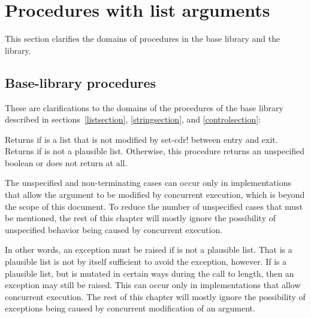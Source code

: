 \section{Procedures with list arguments}
\label{proceduresmutablelistargumentssection}

This section clarifies the domains of procedures in the base
library and the  library.

\subsection{Base-library procedures}

These are clarifications to the domains of the procedures of the base
library described in sections~\ref{listsection}, \ref{stringsection},
and \ref{controlsection}:

\begin{entry}{%
}

Returns \schtrue{} if  is a list that is not modified
by {\cf set-cdr!} between entry and exit.
Returns \schfalse{} if  is not a plausible list.
Otherwise, this procedure returns an unspecified boolean
or does not return at all.

\begin{note}
The unspecified and non-terminating cases can occur only
in implementations that allow the argument to be modified
by concurrent execution, which is beyond the scope of this
document.
To reduce the number of unspecified cases that must be
mentioned, the rest of this chapter will mostly ignore
the possibility of unspecified behavior being caused by
concurrent execution.
\end{note}
\end{entry}

\begin{entry}{%
}


\begin{note}
In other words, an exception must be raised if 
is not a plausible list.
That  is a plausible list is not by
itself sufficient to avoid the exception, however.
If  is a plausible list, but is
mutated in certain ways during the call to {\cf length},
then an exception may still be raised.
This can occur only in implementations that allow
concurrent execution.  The rest of this chapter
will mostly ignore the possibility of exceptions being
caused by concurrent modification of an argument.
\end{note}
\end{entry}


